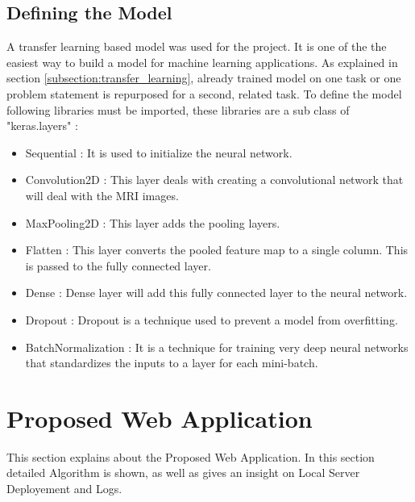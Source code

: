 \subsection{Defining the Model}
A transfer learning based model was used for the project. It is one of the the easiest way to build a model for machine learning applications. As explained in section \ref{subsection:transfer_learning}, already trained model on one task or one problem statement is repurposed for a second, related task. To define the model following libraries must be imported, these libraries are a sub class of "keras.layers" :
\begin{itemize}
    \item Sequential : It is used to initialize the neural network.
    \item Convolution2D : This layer deals with creating a convolutional network that will deal with the MRI images.
    \item MaxPooling2D : This layer adds the pooling layers.
    \item Flatten : This layer converts the pooled feature map to a single column. This is passed to the fully connected layer.
    \item Dense : Dense layer will add this fully connected layer to the neural network.
    \item Dropout : Dropout is a technique used to prevent a model from overfitting.
    \item BatchNormalization : It is a technique for training very deep neural networks that standardizes the inputs to a layer for each mini-batch.
\end{itemize}


\section{Proposed Web Application}
This section explains about the Proposed Web Application. In this section detailed Algorithm is shown, as well as gives an insight on Local Server Deployement and Logs.

